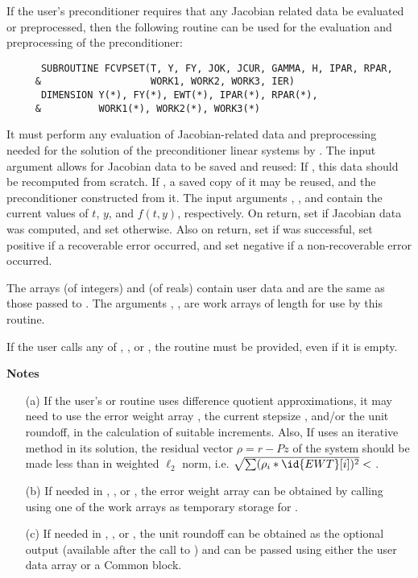 \begin{Steps}
  If the user's preconditioner requires that any Jacobian related data be evaluated
  or preprocessed, then the following routine can be used for the evaluation and 
  preprocessing of the preconditioner:
\begin{verbatim}
      SUBROUTINE FCVPSET(T, Y, FY, JOK, JCUR, GAMMA, H, IPAR, RPAR,
     &                   WORK1, WORK2, WORK3, IER)
      DIMENSION Y(*), FY(*), EWT(*), IPAR(*), RPAR(*), 
     &          WORK1(*), WORK2(*), WORK3(*) 
\end{verbatim}
  It must perform any evaluation of Jacobian-related data and preprocessing needed
  for the solution of the preconditioner linear systems by .
  The input argument  allows for Jacobian data to be saved and reused:
  If , this data should be recomputed from scratch. If ,
  a saved copy of it may be reused, and the preconditioner constructed from it.
  The input arguments , , and  contain the current
  values of $t$, $y$, and $f(t,y)$, respectively.
  On return, set  if Jacobian data was computed, and set
   otherwise.
  Also on return, set  if  was successful, set 
  positive if a recoverable error occurred, and set  negative if a 
  non-recoverable error occurred.
  
  The arrays  (of integers) and  (of reals) contain user data
  and are the same as those passed to .
  The arguments , ,  are work arrays of length 
   for use by this routine.

  {\warn}If the user calls any of , , or 
  , the routine  must
  be provided, even if it is empty.

  {\bf Notes} 
  \begin{itemize}
  \item[(a) ] If the user's  or  routine uses difference
    quotient approximations, it may need to use the error weight array ,
    the current stepsize , and/or the unit roundoff, in the calculation of
    suitable increments.  Also, If  uses an iterative method in its
    solution, the residual vector $\rho = r - Pz$ of the system should be made
    less than  in weighted $\ell_2$ norm, i.e.
    $\sqrt{\sum(\rho_i * \id{EWT}[i])^2} < $ .
  \item[(b) ] If needed in , , or , the
    error weight array  can be obtained by calling 
    using one of the work arrays as temporary storage for .
  \item[(c) ] If needed in , , or , the
    unit roundoff can be obtained as the optional output 
    (available after the call to ) and can be passed
    using either the  user data array or a Common block.
  \end{itemize}


\end{Steps}
